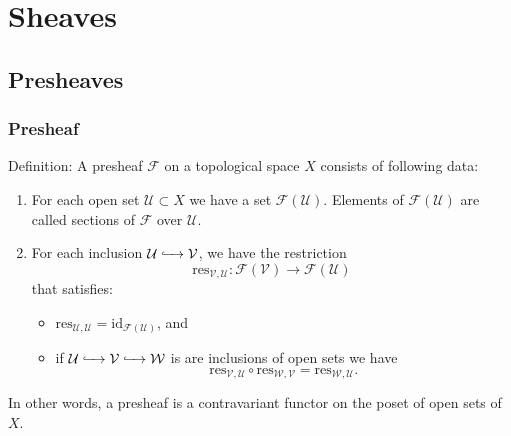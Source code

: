 \documentclass{beamer}
\begin{document}

\section{Sheaves} %

\subsection{Presheaves} %

\begin{frame}
\frametitle{Presheaf}
Definition: A presheaf $\mathcal{F}$ on a topological space $X$ consists of following data:
\begin{enumerate}
    \item For each open set $\mathcal{U}\subset X$ we have a set $\mathcal{F}(\mathcal{U})$.
        Elements of $\mathcal{F}(\mathcal{U})$ are called sections of $\mathcal{F}$
        over $\mathcal{U}$.

    \item For each inclusion $\mathcal{U}\xhookrightarrow{\quad} \mathcal{V}$, we have the restriction
        $$\text{res}_{\mathcal{V},\mathcal{U}}: \mathcal{F}(\mathcal{V})\longrightarrow
        \mathcal{F}(\mathcal{U})$$
        that satisfies:
        \begin{itemize}
            \item $ \text{res}_{\mathcal{U},\mathcal{U}} = \text{id}_{\mathcal{F}(\mathcal{U})}$, and
            \item if $\mathcal{U}\xhookrightarrow{\quad} \mathcal{V}\xhookrightarrow{\quad}
                \mathcal{W}$ is are inclusions of open sets we have 
                $$\text{res}_{\mathcal{V},\mathcal{U}}
                \circ\text{res}_{\mathcal{W},\mathcal{V}} = \text{res}_{\mathcal{W},\mathcal{U}}.$$
        \end{itemize}
\end{enumerate}

In other words, a presheaf is a contravariant functor on the poset of open sets of $X$.
\end{frame}
\end{document}
